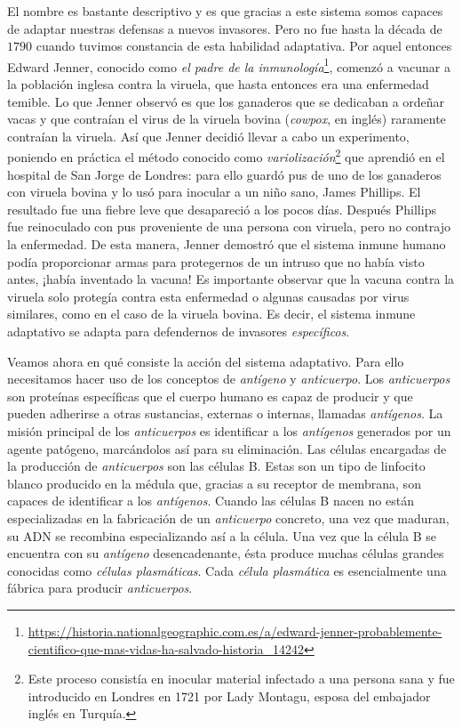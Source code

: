 El nombre es bastante descriptivo y es que gracias a este sistema somos capaces de adaptar nuestras defensas a nuevos invasores. Pero no fue hasta la década de $1790$ cuando tuvimos constancia de esta habilidad adaptativa. Por aquel entonces Edward Jenner, conocido como \textit{el padre de la inmunología}\footnote{\url{https://historia.nationalgeographic.com.es/a/edward-jenner-probablemente-cientifico-que-mas-vidas-ha-salvado-historia_14242}}, comenzó a vacunar a la población inglesa contra la viruela, que hasta entonces era una enfermedad temible. Lo que Jenner observó es que los ganaderos que se dedicaban a ordeñar vacas y que contraían el virus de la viruela bovina (\textit{cowpox}, en inglés) raramente contraían la viruela. Así que Jenner decidió llevar a cabo un experimento, poniendo en práctica el método conocido como \textit{variolización}\footnote{Este proceso consistía en inocular material infectado a una persona sana y fue introducido en Londres en 1721 por Lady Montagu, esposa del embajador inglés en Turquía.} que aprendió en el hospital de San Jorge de Londres: para ello guardó pus de uno de los ganaderos con viruela bovina y lo usó para inocular a un niño sano, James Phillips. El resultado fue una fiebre leve que desapareció a los pocos días. Después Phillips fue reinoculado con pus proveniente de una persona con viruela, pero no contrajo la enfermedad. De esta manera, Jenner demostró que el sistema inmune humano podía proporcionar armas para protegernos de un intruso que no había visto antes, ¡había inventado la vacuna! Es importante observar que la vacuna contra la viruela solo protegía contra esta enfermedad o algunas causadas por virus similares, como en el caso de la viruela bovina. Es decir, el sistema inmune adaptativo se adapta para defendernos de invasores \textit{específicos}. 

Veamos ahora en qué consiste la acción del sistema adaptativo. Para ello necesitamos hacer uso de los conceptos de \textit{antígeno} y \textit{anticuerpo}. Los \textit{anticuerpos} son proteínas específicas que el cuerpo humano es capaz de producir y que pueden adherirse a otras sustancias, externas o internas, llamadas \textit{antígenos}. La misión principal de los \textit{anticuerpos} es identificar a los \textit{antígenos} generados por un agente patógeno, marcándolos así para su eliminación. Las células encargadas de la producción de \textit{anticuerpos} son las células B. Estas son un tipo de linfocito blanco producido en la médula que, gracias a su receptor de membrana, son capaces de identificar a los \textit{antígenos}. Cuando las células B nacen no están especializadas en la fabricación de un \textit{anticuerpo} concreto, una vez que maduran, su ADN se recombina especializando así a la célula. Una vez que la célula B se encuentra con su \textit{antígeno} desencadenante, ésta produce muchas células grandes conocidas como \textit{células plasmáticas}. Cada \textit{célula plasmática} es esencialmente una fábrica para producir \textit{anticuerpos}. 

